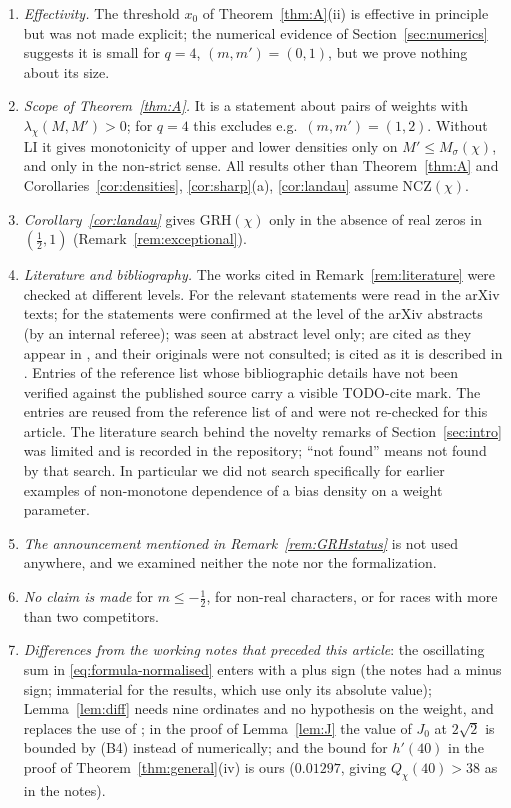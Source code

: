 \documentclass[11pt]{amsart}
\theoremstyle{definition}
\numberwithin{equation}{section}
\begin{document}
\begin{enumerate}
values in Remark~\ref{rem:corner} are quoted from a repository note
and are not claimed as results of this article.
\item \emph{Effectivity.} The threshold $x_0$ of
Theorem~\ref{thm:A}(ii) is effective in principle but was not made
explicit; the numerical evidence of Section~\ref{sec:numerics}
suggests it is small for $q=4$, $(m,m')=(0,1)$, but we prove nothing
about its size.
\item \emph{Scope of Theorem~\ref{thm:A}.} It is a statement about
pairs of weights with $\lambda_\chi(M,M')>0$; for $q=4$ this excludes
e.g.\ $(m,m')=(1,2)$. Without LI it gives monotonicity of upper and
lower densities only on $M'\le M_\sigma(\chi)$, and only in the
non-strict sense. All results other than Theorem~\ref{thm:A} and
Corollaries~\ref{cor:densities}, \ref{cor:sharp}(a),
\ref{cor:landau} assume NCZ$(\chi)$.
\item \emph{Corollary~\ref{cor:landau}} gives GRH$(\chi)$ only in the
absence of real zeros in $(\tfrac12,1)$
(Remark~\ref{rem:exceptional}).
\item \emph{Literature and bibliography.} The works cited in
Remark~\ref{rem:literature} were checked at different levels. For
\cite{PT19,Was24,BBLMR24} the relevant statements were read in the
arXiv texts; for \cite{Joh23,Zhao25,Suz25,Hay25} the statements were
confirmed at the level of the arXiv abstracts (by an internal
referee); \cite{LWS26} was seen at abstract level only;
\cite{HL18,Lan18,Fuj88} are cited as they appear in \cite{PT19}, and
their originals were not consulted; \cite{GW18} is cited as it is
described in \cite{Was24}. Entries of the reference list whose
bibliographic details have not been verified against the published
source carry a visible \textsf{TODO-cite} mark. The entries
\cite{AK23,Sheth24,SK25,Aym22,BMS26,BMOR21,Wat44,Bir48,Pro65,KS99} are
reused from the reference list of \cite{WR} and were not re-checked
for this article. The literature search behind the novelty remarks of
Section~\ref{sec:intro} was limited and is recorded in the repository;
``not found'' means not found by that search. In particular we did
not search specifically for earlier examples of non-monotone
dependence of a bias density on a weight parameter.
\item \emph{The announcement mentioned in
Remark~\ref{rem:GRHstatus}} is not used anywhere, and we examined
neither the note nor the formalization.
\item \emph{No claim is made} for $m\le-\tfrac12$, for non-real
characters, or for races with more than two competitors.
\item \emph{Differences from the working notes that preceded this
article}: the oscillating sum in \eqref{eq:formula-normalised} enters
with a plus sign (the notes had a minus sign; immaterial for the
results, which use only its absolute value);
Lemma~\ref{lem:diff} needs nine ordinates and no hypothesis on the
weight, and replaces the use of \cite[Lemma~21]{WR}; in the proof of
Lemma~\ref{lem:J} the value of $J_0$ at $2\sqrt2$ is bounded by (B4)
instead of numerically; and the bound for $h'(40)$ in the proof of
Theorem~\ref{thm:general}(iv) is ours ($0.01297$, giving
$Q_\chi(40)>38$ as in the notes).
\end{enumerate}
\end{document}
